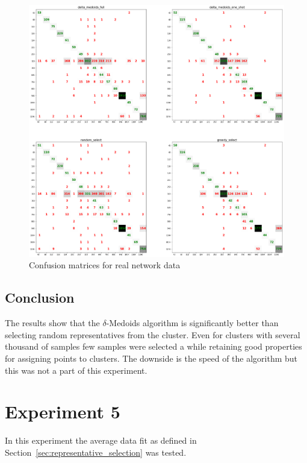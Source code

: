 \documentclass[thesis=B,english]{FITthesis}[2012/10/20]
\begin{document}
\begin{figure}[H]
   \includegraphics[width=\linewidth]{img/exp4.png}
  \caption{Confusion matrices for real network data}
  \label{img:exp4}
\end{figure}


\subsection{Conclusion}
The results show that the $\delta$-Medoids algorithm is significantly better than selecting random representatives from the cluster.
Even for clusters with several thousand of samples few samples were selected a while retaining good properties for assigning points to clusters.
The downside is the speed of the algorithm but this was not a part of this experiment.


\section{Experiment 5}\label{sec:exp5}

In this experiment the average data fit as defined in Section~\ref{sec:representative_selection} was tested.
\end{document}

